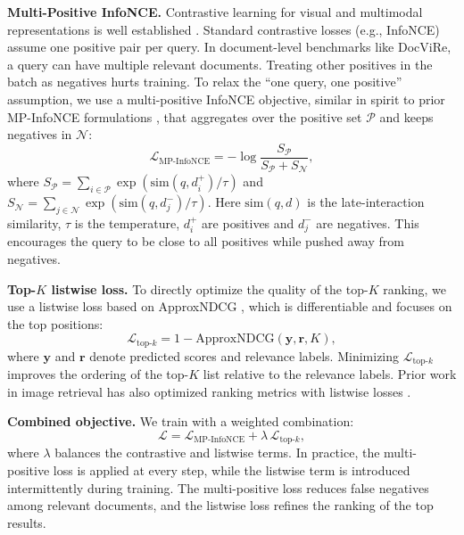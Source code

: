 \textbf{Multi-Positive InfoNCE.} Contrastive learning for visual and multimodal representations is well established \citep{pmlr-v119-chen20j,He_2020_CVPR,oord2018infonce}. Standard contrastive losses (e.g., InfoNCE) assume one positive pair per query. In document-level benchmarks like DocViRe, a query can have multiple relevant documents. Treating other positives in the batch as negatives hurts training. To relax the ``one query, one positive'' assumption, we use a multi-positive InfoNCE objective, similar in spirit to prior MP-InfoNCE formulations \citep{rivas2024conked}, that aggregates over the positive set $\mathcal{P}$ and keeps negatives in $\mathcal{N}$:
\begin{equation}
\mathcal{L}_{\mathrm{MP}\mbox{-}\mathrm{InfoNCE}} = -\log \frac{S_{\mathcal{P}}}{S_{\mathcal{P}} + S_{\mathcal{N}}},
\label{eq:mp-infonce}
\end{equation}
where $S_{\mathcal{P}} = \sum_{i \in \mathcal{P}} \exp(\mathrm{sim}(q, d_i^+) / \tau)$ and $S_{\mathcal{N}} = \sum_{j \in \mathcal{N}} \exp(\mathrm{sim}(q, d_j^-) / \tau)$. Here $\mathrm{sim}(q, d)$ is the late-interaction similarity, $\tau$ is the temperature, $d_i^+$ are positives and $d_j^-$ are negatives. This encourages the query to be close to all positives while pushed away from negatives.

\textbf{Top-$K$ listwise loss.} To directly optimize the quality of the top-$K$ ranking, we use a listwise loss based on ApproxNDCG \citep{qin2010general}, which is differentiable and focuses on the top positions:
\begin{equation}
\mathcal{L}_{\mathrm{top}\mbox{-}k} = 1 - \mathrm{ApproxNDCG}(\mathbf{y}, \mathbf{r}, K),
\label{eq:topk-loss}
\end{equation}
where $\mathbf{y}$ and $\mathbf{r}$ denote predicted scores and relevance labels.
Minimizing $\mathcal{L}_{\mathrm{top}\mbox{-}k}$ improves the ordering of the top-$K$ list relative to the relevance labels. Prior work in image retrieval has also optimized ranking metrics with listwise losses \citep{Revaud_2019_ICCV}.

\textbf{Combined objective.} We train with a weighted combination:
\begin{equation}
\mathcal{L} = \mathcal{L}_{\mathrm{MP}\mbox{-}\mathrm{InfoNCE}} + \lambda \,\mathcal{L}_{\mathrm{top}\mbox{-}k},
\label{eq:combined-loss}
\end{equation}
where $\lambda$ balances the contrastive and listwise terms. In practice, the multi-positive loss is applied at every step, while the listwise term is introduced intermittently during training. The multi-positive loss reduces false negatives among relevant documents, and the listwise loss refines the ranking of the top results.

